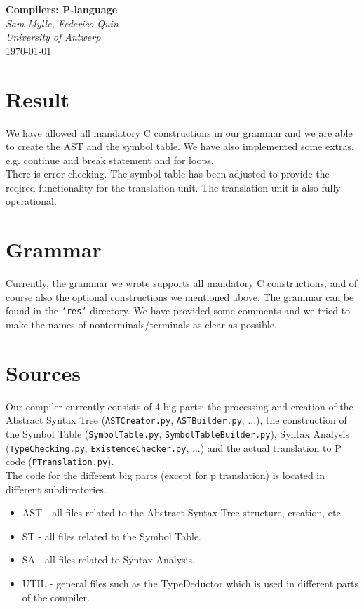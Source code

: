\documentclass{article}
\begin{document}
\begin{titlepage}
   \begin{center}
      \Large\textbf{Compilers: P-language}\\
      \large\textit{Sam Mylle, Federico Quin \\ University of Antwerp} \\
      \today
   \end{center}
\end{titlepage}

\section{Result}
We have allowed all mandatory C constructions in our grammar and we are able to create the AST and the symbol table. We have also implemented some extras, e.g. continue and break statement and for loops. \\
There is error checking. The symbol table has been adjusted to provide the reqired functionality for the translation unit. The translation unit is also fully operational.

\section{Grammar}
Currently, the grammar we wrote supports all mandatory C constructions, and of course also the optional constructions we mentioned above. The grammar can be found in the \texttt{`res`} directory. We have provided some comments and we tried to make the names of nonterminals/terminals as clear as possible.

\section{Sources}
Our compiler currently consists of 4 big parts: the processing and creation of the Abstract Syntax Tree (\texttt{ASTCreator.py}, \texttt{ASTBuilder.py}, ...), the construction of the Symbol Table (\texttt{SymbolTable.py}, \texttt{SymbolTableBuilder.py}), Syntax Analysis (\texttt{TypeChecking.py}, \texttt{ExistenceChecker.py}, ...) and the actual translation to P code (\texttt{PTranslation.py}).
\\
The code for the different big parts (except for p translation) is located in different subdirectories. \\
\begin{itemize}
	\item AST - all files related to the Abstract Syntax Tree structure, creation, etc.
	\item ST - all files related to the Symbol Table.
	\item SA - all files related to Syntax Analysis.
	\item UTIL - general files such as the TypeDeductor which is used in different parts of the compiler.
\end{itemize}
\end{document}
